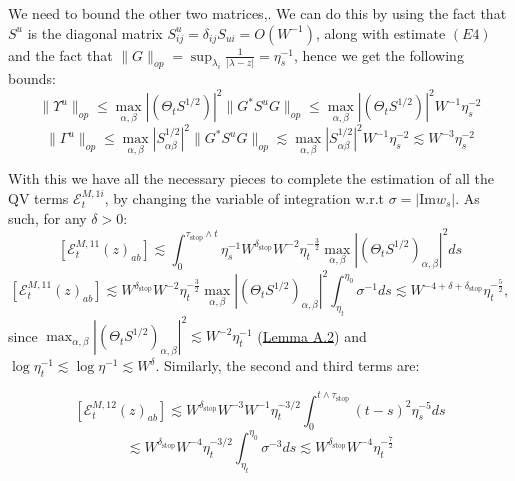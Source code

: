\documentclass[11pt]{article}
\newcommand{\sto}{\text{stop}}
\begin{document}
\noindent We need to bound the other two matrices,. We can do this by using the fact that $S^u$ is the diagonal matrix $S^u_{ij} = \delta_{ij}S_{ui} = O(W^{-1})$, along with estimate $(E4)$ and the fact that $\|G\|_{op} = \sup_{\lambda_i}\frac{1}{|\lambda -z|}  = \eta_s^{-1}$,
hence we get the following bounds:
$$\|\Upsilon^u\|_{op}\leq \max_{\alpha, \beta}|(\Theta_t S^{1/2})|^2\|G^* S^u G\|_{op}\leq \max_{\alpha, \beta}|(\Theta_t S^{1/2})|^2 W^{-1}\eta_s^{-2}$$
$$\|\Gamma^u\|_{op}\leq\max_{\alpha,\beta}|S_{\alpha\beta}^{1/2}|^2\|G^* S^u G\|_{op}\lesssim \max_{\alpha,\beta}|S_{\alpha\beta}^{1/2}|^2 W^{-1}\eta_s^{-2}\lesssim W^{-3}\eta_s^{-2}$$

\noindent With this we have all the necessary pieces to complete the estimation of all the QV terms $\mathcal{E}^{M, 1i}_t$, by changing the variable of integration w.r.t $\sigma = |\text{Im}w_s|$. As such, for any $\delta>0$:
$$\left[\mathcal{E}_{t}^{M, 11}(z)_{ab}\right]\lesssim \int_0^{\tau_\sto\wedge t} \eta_s^{-1} W^{\delta_\sto}W^{-2}\eta_t^{-\frac{3}{2}}\max_{\alpha, \beta}|(\Theta_t S^{1/2})_{\alpha, \beta}|^2ds$$
$$\left[\mathcal{E}_{t}^{M, 11}(z)_{ab}\right]\lesssim W^{\delta_\sto}W^{-2}\eta_t^{-\frac{3}{2}} \max_{\alpha, \beta}|(\Theta_t S^{1/2})_{\alpha, \beta}|^2 \int_{\eta_t}^{\eta_0} \sigma^{-1}ds\lesssim W^{-4+\delta+\delta_\sto}\eta_t^{-\frac{5}{2}},$$
since $\max_{\alpha, \beta}|(\Theta_t S^{1/2})_{\alpha, \beta}|^2 \lesssim W^{-2}\eta_t^{-1}$ (\hyperref[lemma-a2]{Lemma A.2}) and $\log \eta_t^{-1}\lesssim \log \eta^{-1}\lesssim W^{\delta}$. Similarly, the second and third terms are: 

$$\left[\mathcal{E}_{t}^{M, 12}(z)_{ab}\right] \lesssim  W^{\delta_\sto} W^{-3}W^{-1}\eta_t^{-3/2}\int_0^{t\wedge \tau_\sto}(t-s)^2\eta_s^{-5}ds$$
$$\lesssim W^{\delta_\sto}W^{-4}\eta_t^{-3/2}\int_{\eta_t}^{\eta_0}\sigma^{-3}ds\lesssim W^{\delta_\sto} W^{-4}\eta_t^{-\frac{7}{2}}$$
\end{document}
